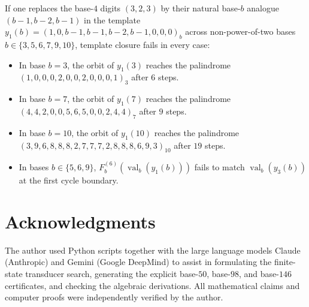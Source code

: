 \documentclass[12pt,reqno]{article}
\DeclareMathOperator{\val}{val}
\begin{document}
If one replaces the base-$4$ digits $(3, 2, 3)$ by their natural base-$b$ analogue $(b-1, b-2, b-1)$ in the template $y_1(b) = (1, 0, b-1, b-1, b-2, b-1, 0, 0, 0)_b$ across non-power-of-two bases $b \in \{3, 5, 6, 7, 9, 10\}$, template closure fails in every case:
\begin{itemize}
\item In base $b = 3$, the orbit of $y_1(3)$ reaches the palindrome $(1, 0, 0, 0, 2, 0, 0, 2, 0, 0, 0, 1)_3$ after $6$ steps.
\item In base $b = 7$, the orbit of $y_1(7)$ reaches the palindrome $(4, 4, 2, 0, 0, 5, 6, 5, 0, 0, 2, 4, 4)_7$ after $9$ steps.
\item In base $b = 10$, the orbit of $y_1(10)$ reaches the palindrome $(3, 9, 6, 8, 8, 8, 2, 7, 7, 7, 2, 8, 8, 8, 6, 9, 3)_{10}$ after $19$ steps.
\item In bases $b \in \{5, 6, 9\}$, $F_b^{(6)}(\val_b(y_1(b)))$ fails to match $\val_b(y_3(b))$ at the first cycle boundary.
\end{itemize}

\section{Acknowledgments}\label{sec:ack}

The author used Python scripts together with the large language models Claude (Anthropic) and Gemini (Google DeepMind) to assist in formulating the finite-state transducer search, generating the explicit base-$50$, base-$98$, and base-$146$ certificates, and checking the algebraic derivations. All mathematical claims and computer proofs were independently verified by the author.
\end{document}
